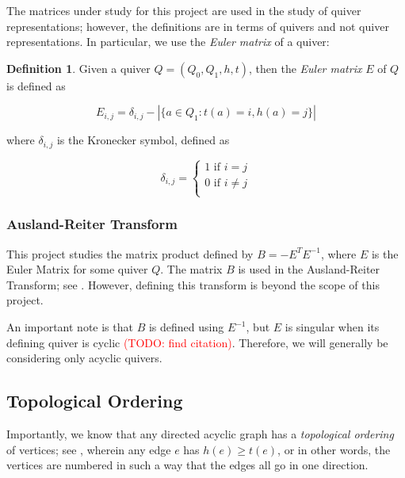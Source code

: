 \documentclass{amsart}
\theoremstyle{theorem}
\theoremstyle{theorem*}
\theoremstyle{definition}
\newtheorem{definition}{Definition}
\begin{document}
The matrices under study for this project are used in the study of quiver
representations; however, the definitions are in terms of quivers and not
quiver representations. In particular, we use the \textit{Euler matrix}
of a quiver:

\begin{definition} \cite{dw} Given a quiver $Q = (Q_0, Q_1, h, t)$, then the
    \textit{Euler matrix} $E$ of $Q$ is defined as

    $$E_{i,j} = \delta_{i,j} - |\{a \in Q_1 : t(a) = i, h(a) = j \}|$$

    where $\delta_{i,j}$ is the Kronecker symbol, defined as

    $$\delta_{i,j} = \begin{cases} 1 \text{ if } i = j \\ 0 \text{ if } i \neq j
            \\\end{cases}$$

\end{definition}

\subsubsection{Ausland-Reiter Transform}

This project studies the matrix product defined by $B = -E^T E^{-1}$, where $E$
is the Euler Matrix for some quiver $Q$. The matrix $B$ is used in the
Ausland-Reiter Transform; see \cite{dw}. However, defining this transform is
beyond the scope of this project.

An important note is that $B$ is defined using $E^{-1}$, but $E$ is 
singular when its defining quiver is cyclic 
\textcolor{red}{(TODO: find citation)}. Therefore, we will
generally be considering only acyclic quivers.


\subsection{Topological Ordering}

Importantly, we know that any directed acyclic graph has a
\textit{topological ordering} of vertices; see \cite{sw},
wherein any edge $e$ has $h(e) \geq t(e)$,
or in other words, the vertices are numbered in such a way that the
edges all go in one direction. 
\end{document}

